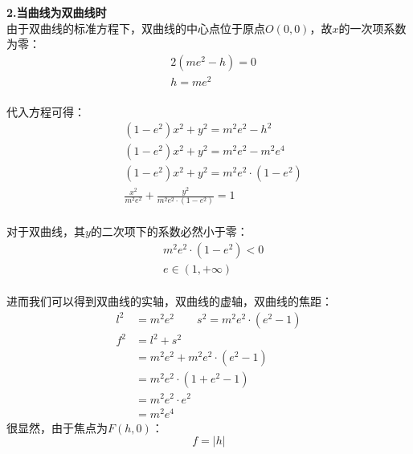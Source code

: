 \documentclass[UTF8]{ctexart}
\begin{document}
\newpage

    \textbf{2.当曲线为双曲线时}\\[3mm]
    \setcounter{equation}{0}
    由于双曲线的标准方程下，双曲线的中心点位于原点$O(0,0)$，故$x$的一次项系数为零：\vspace{5pt}
    \begin{align}
        &2\left(me^2-h\right)=0\\[3mm]
        &h=me^2
    \end{align}\\
    代入方程可得：
    \begin{align}
        &\left(1-e^2\right)x^2+y^2=m^2e^2-h^2\\[3mm]
        &\left(1-e^2\right)x^2+y^2=m^2e^2-m^2e^4\\[3mm]
        &\left(1-e^2\right)x^2+y^2=m^2e^2\cdot\left(1-e^2\right)\\[3mm]
        &\frac{x^2}{m^2e^2}+\frac{y^2}{m^2e^2\cdot\left(1-e^2\right)}=1
    \end{align}\\[1mm]
    对于双曲线，其$y$的二次项下的系数必然小于零：\vspace{5pt}
    \begin{align}
        &m^2e^2\cdot\left(1-e^2\right)<0\\[3mm]
        &e\in(1,+\infty)
    \end{align}\\
    进而我们可以得到双曲线的实轴，双曲线的虚轴，双曲线的焦距：\vspace{5pt}
    \begin{align}
        l^2&=m^2e^2\qquad s^2=m^2e^2\cdot\left(e^2-1\right)\\[4mm]
        f^2&=l^2+s^2\\[3mm]
        &=m^2e^2+m^2e^2\cdot\left(e^2-1\right)\\[3mm]
        &=m^2e^2\cdot\left(1+e^2-1\right)\\[3mm]
        &=m^2e^2\cdot e^2\\[3mm]
        &=m^2e^4
    \end{align}
    很显然，由于焦点为$F(h,0)$：
    \begin{equation}
        f=|h|
    \end{equation}

    \newpage
\end{document}
